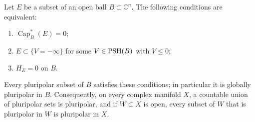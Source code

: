 \begin{theorem}\label{thm:zero-capacity-pluripolar}
Let $E$ be a subset of an open ball $B\subset\mathbb C^n$. The following conditions are equivalent:
\begin{enumerate}
\item $\operatorname{Cap}_B^*(E)=0$;
\item $E\subset\{V=-\infty\}$ for some $V\in\mathrm{PSH}(B)$ with $V\le0$;
\item $H_E=0$ on $B$.
\end{enumerate}
Every pluripolar subset of $B$ satisfies these conditions; in particular it is globally pluripolar in $B$. Consequently, on every complex manifold $X$, a countable union of pluripolar sets is pluripolar, and if $W\subset X$ is open, every subset of $W$ that is pluripolar in $W$ is pluripolar in $X$.
\end{theorem}

